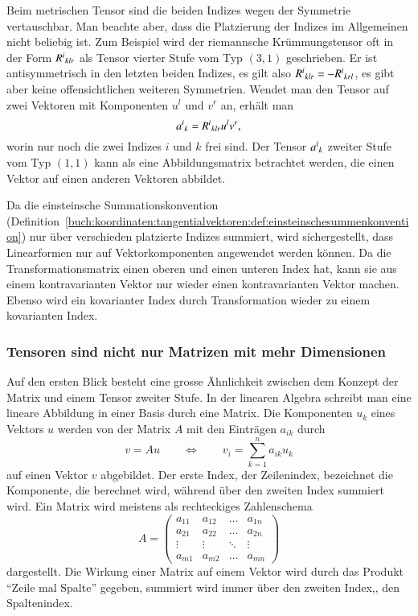 Beim metrischen Tensor sind die beiden Indizes wegen der Symmetrie
vertauschbar.
Man beachte aber, dass die Platzierung der Indizes im Allgemeinen nicht
beliebig ist.
Zum Beispiel wird der riemannsche Krümmungstensor oft in der Form
\(
R^i\mathstrut_{klr}
\)
%
als Tensor vierter Stufe vom Typ $(3,1)$ geschrieben.
Er ist antisymmetrisch in den letzten beiden Indizes, es gilt also
\(
R^i\mathstrut_{klr}
=
-
R^i\mathstrut_{krl}
\),
es gibt aber keine offensichtlichen weiteren Symmetrien.
Wendet man den Tensor auf zwei Vektoren mit Komponenten $u^l$ und
$v^r$ an, erhält man
\[
a^i\mathstrut_k
=
R^i\mathstrut_{klr}u^lv^r,
\]
worin nur noch die zwei Indizes $i$ und $k$ frei sind.
Der Tensor $a^i\mathstrut_k$ zweiter Stufe vom Typ $(1,1)$
kann als eine Abbildungsmatrix betrachtet werden,
die einen Vektor auf einen anderen Vektoren abbildet.

Da die einsteinsche Summationskonvention
(Definition~\ref{buch:koordinaten:tangentialvektoren:def:einsteinschesummenkonvention})
nur über verschieden platzierte
Indizes summiert, wird sichergestellt, dass Linearformen nur auf
Vektorkomponenten angewendet werden können.
Da die Transformationsmatrix einen oberen und einen unteren Index hat,
kann sie aus einem kontravarianten Vektor nur wieder einen kontravarianten
Vektor machen.
Ebenso wird ein kovarianter Index durch Transformation wieder zu einem
kovarianten Index.

%
%
\subsubsection{Tensoren sind nicht nur Matrizen mit mehr Dimensionen}
Auf den ersten Blick besteht eine grosse Ähnlichkeit zwischen dem
Konzept der Matrix und einem Tensor zweiter Stufe.
In der linearen Algebra schreibt man eine lineare Abbildung in einer
Basis durch eine Matrix.
Die Komponenten $u_k$ eines Vektors $u$ werden von der Matrix $A$
mit den Einträgen $a_{ik}$ durch
\[
v = Au
\qquad\Leftrightarrow\qquad
v_i = \sum_{k=1}^n a_{ik}u_k
\]
auf einen Vektor $v$ abgebildet.
Der erste Index, der Zeilenindex, bezeichnet die Komponente, die berechnet
wird, während über den zweiten Index summiert wird.
Ein Matrix wird meistens als rechteckiges Zahlenschema
\[
A
=
\begin{pmatrix}
a_{11} & a_{12} & \dots  & a_{1n} \\
a_{21} & a_{22} & \dots  & a_{2n} \\[-2pt]
\vdots & \vdots & \ddots & \vdots \\[-1pt]
a_{m1} & a_{m2} & \dots  & a_{mn}
\end{pmatrix}
\]
dargestellt.
Die Wirkung einer Matrix auf einem Vektor wird durch das Produkt
``Zeile mal Spalte'' gegeben, summiert wird immer über den zweiten
Index,, den Spaltenindex.

